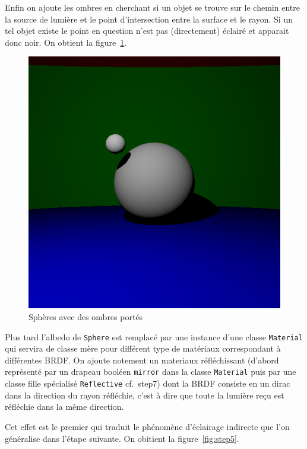 \documentclass[12pt]{article}
\newcommand\id[1]{\texttt{#1}}
\begin{document}
Enfin on ajoute les ombres en cherchant si un objet se trouve sur le chemin entre la source de lumière et le point d'intersection entre la surface et le rayon.
Si un tel objet existe le point en question n'est pas (directement) éclairé et apparait donc noir.
On obtient la figure~\ref{fig:step4}.

\begin{figure}[ht]
  \centering
  \includegraphics[width=12cm]{../result/step4}
  \caption{Sphères avec des ombres portés}\label{fig:step4}
\end{figure}

Plus tard l'albedo de \id{Sphere} est remplacé par une instance d'une classe \id{Material} qui servira de classe mère pour différent type de matériaux correspondant à différentes BRDF\@.
On ajoute notement un materiaux réfléchissant (d'abord représenté par un drapeau booléen \id{mirror} dans la classe \id{Material} puis par une classe fille spécialisé \id{Reflective} cf.\ step7) dont la BRDF consiste en un dirac dans la direction du rayon réfléchie, c'est à dire que toute la lumière reçu est réfléchie dans la même direction.

Cet effet est le premier qui traduit le phénomène d'éclairage indirecte que l'on généralise dans l'étape suivante.
On obitient la figure~\ref{fig:step5}.
\end{document}
